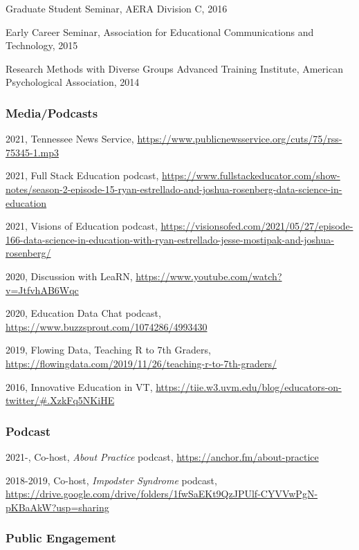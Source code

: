 \documentclass[
  14,
]{article}
\begin{document}
Graduate Student Seminar, AERA Division C, 2016

Early Career Seminar, Association for Educational Communications and
Technology, 2015

Research Methods with Diverse Groups Advanced Training Institute,
American Psychological Association, 2014

\hypertarget{mediapodcasts}{%
\subsubsection{Media/Podcasts}\label{mediapodcasts}}

2021, Tennessee News Service,
\url{https://www.publicnewsservice.org/cuts/75/rss-75345-1.mp3}

2021, Full Stack Education podcast,
\url{https://www.fullstackeducator.com/show-notes/season-2-episode-15-ryan-estrellado-and-joshua-rosenberg-data-science-in-education}

2021, Visions of Education podcast,
\url{https://visionsofed.com/2021/05/27/episode-166-data-science-in-education-with-ryan-estrellado-jesse-mostipak-and-joshua-rosenberg/}

2020, Discussion with LeaRN,
\url{https://www.youtube.com/watch?v=JtfvhAB6Wqc}

2020, Education Data Chat podcast,
\url{https://www.buzzsprout.com/1074286/4993430}

2019, Flowing Data, Teaching R to 7th Graders,
\url{https://flowingdata.com/2019/11/26/teaching-r-to-7th-graders/}

2016, Innovative Education in VT,
\url{https://tiie.w3.uvm.edu/blog/educators-on-twitter/\#.XzkFq5NKiHE}

\hypertarget{podcast}{%
\subsubsection{Podcast}\label{podcast}}

2021-, Co-host, \emph{About Practice} podcast,
\url{https://anchor.fm/about-practice}

2018-2019, Co-host, \emph{Impodster Syndrome} podcast,
\url{https://drive.google.com/drive/folders/1fwSaEKt9QzJPUlf-CYVVwPgN-pKBaAkW?usp=sharing}

\hypertarget{public-engagement}{%
\subsubsection{Public Engagement}\label{public-engagement}}
\end{document}

